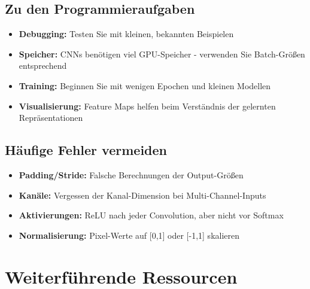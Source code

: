 \documentclass[12pt,a4paper]{article}
\begin{document}
\subsection*{Zu den Programmieraufgaben}
\begin{itemize}
    \item \textbf{Debugging:} Testen Sie mit kleinen, bekannten Beispielen
    \item \textbf{Speicher:} CNNs benötigen viel GPU-Speicher - verwenden Sie Batch-Größen entsprechend
    \item \textbf{Training:} Beginnen Sie mit wenigen Epochen und kleinen Modellen
    \item \textbf{Visualisierung:} Feature Maps helfen beim Verständnis der gelernten Repräsentationen
\end{itemize}

\subsection*{Häufige Fehler vermeiden}
\begin{itemize}
    \item \textbf{Padding/Stride:} Falsche Berechnungen der Output-Größen
    \item \textbf{Kanäle:} Vergessen der Kanal-Dimension bei Multi-Channel-Inputs
    \item \textbf{Aktivierungen:} ReLU nach jeder Convolution, aber nicht vor Softmax
    \item \textbf{Normalisierung:} Pixel-Werte auf [0,1] oder [-1,1] skalieren
\end{itemize}

\section*{Weiterführende Ressourcen}
\end{document}
